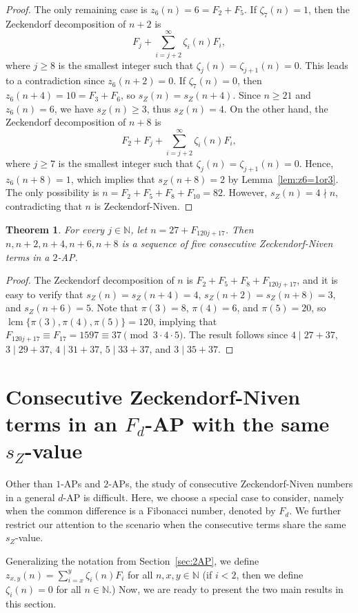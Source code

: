 \documentclass[12pt]{article}
\newtheorem{theorem}{Theorem}[section]
\theoremstyle{definition}
\newcommand{\N}{\mathbb{N}}
\DeclareMathOperator{\lcm}{lcm}
\begin{document}
\begin{proof}
The only remaining case is $z_6(n)=6=F_2+F_5$. If $\zeta_7(n)=1$, then the Zeckendorf decomposition of $n+2$ is
\[F_j+\sum_{i=j+2}^\infty\zeta_i(n)F_i,\]
where $j\geq8$ is the smallest integer such that $\zeta_j(n)=\zeta_{j+1}(n)=0$. This leads to a contradiction since $z_6(n+2)=0$. If $\zeta_7(n)=0$, then $z_6(n+4)=10=F_3+F_6$, so $s_Z(n)=s_Z(n+4)$. Since $n\geq21$ and $z_6(n)=6$, we have $s_Z(n)\geq3$, thus $s_Z(n)=4$. On the other hand, the Zeckendorf decomposition of $n+8$ is
\[F_2+F_j+\sum_{i=j+2}^\infty\zeta_i(n)F_i,\]
where $j\geq7$ is the smallest integer such that $\zeta_j(n)=\zeta_{j+1}(n)=0$. Hence, $z_6(n+8)=1$, which implies that $s_Z(n+8)=2$ by Lemma~\ref{lem:z6=1or3}. The only possibility is $n=F_2+F_5+F_8+F_{10}=82$. However, $s_Z(n)=4\nmid n$, contradicting that $n$ is Zeckendorf-Niven.
\end{proof}

\begin{theorem}
For every $j\in\N$, let $n=27+F_{120j+17}$. Then $n,n+2,n+4,n+6,n+8$ is a sequence of five consecutive Zeckendorf-Niven terms in a $2$-AP.
\end{theorem}
\begin{proof}
The Zeckendorf decomposition of $n$ is $F_2+F_5+F_8+F_{120j+17}$, and it is easy to verify that $s_Z(n)=s_Z(n+4)=4$, $s_Z(n+2)=s_Z(n+8)=3$, and $s_Z(n+6)=5$. Note that $\pi(3)=8$, $\pi(4)=6$, and $\pi(5)=20$, so $\lcm\{\pi(3),\pi(4),\pi(5)\}=120$, implying that $F_{120j+17}\equiv F_{17}=1597\equiv37\pmod{3\cdot4\cdot5}$. The result follows since $4\mid 27+37$, $3\mid 29+37$, $4\mid31+37$, $5\mid33+37$, and $3\mid35+37$.
\end{proof}







\section{Consecutive Zeckendorf-Niven terms in an $F_d$-AP with the same $s_Z$-value}\label{sec:Fd}

Other than $1$-APs and $2$-APs, the study of consecutive Zeckendorf-Niven numbers in a general $d$-AP is difficult. Here, we choose a special case to consider, namely when the common difference is a Fibonacci number, denoted by $F_d$. We further restrict our attention to the scenario when the consecutive terms share the same $s_Z$-value.

Generalizing the notation from Section~\ref{sec:2AP}, we define $z_{x,y}(n)=\sum_{i=x}^y\zeta_i(n)F_i$ for all $n,x,y\in\N$ (if $i<2$, then we define $\zeta_i(n)=0$ for all $n\in\N$.) Now, we are ready to present the two main results in this section.
\end{document}
